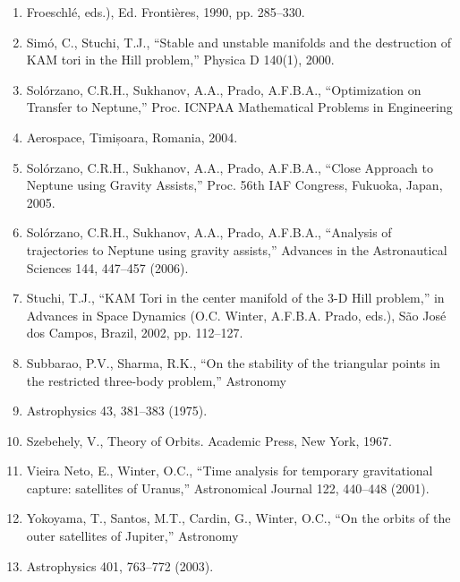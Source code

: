\documentclass[12pt]{article}
\begin{document}
\begin{enumerate}
\item Froeschlé, eds.), Ed. Frontières, 1990, pp. 285--330.
\item Simó, C., Stuchi, T.J., ``Stable and unstable manifolds and the destruction of KAM tori in the Hill problem,'' Physica D 140(1), 2000.
\item Solórzano, C.R.H., Sukhanov, A.A., Prado, A.F.B.A., ``Optimization on Transfer to Neptune,'' Proc. ICNPAA Mathematical Problems in Engineering
\item Aerospace, Timișoara, Romania, 2004.
\item Solórzano, C.R.H., Sukhanov, A.A., Prado, A.F.B.A., ``Close Approach to Neptune using Gravity Assists,'' Proc. 56th IAF Congress, Fukuoka, Japan, 2005.
\item Solórzano, C.R.H., Sukhanov, A.A., Prado, A.F.B.A., ``Analysis of trajectories to Neptune using gravity assists,'' Advances in the Astronautical Sciences 144, 447--457 (2006).
\item Stuchi, T.J., ``KAM Tori in the center manifold of the 3-D Hill problem,'' in Advances in Space Dynamics (O.C. Winter, A.F.B.A. Prado, eds.), São José dos Campos, Brazil, 2002, pp. 112--127.
\item Subbarao, P.V., Sharma, R.K., ``On the stability of the triangular points in the restricted three-body problem,'' Astronomy
\item Astrophysics 43, 381--383 (1975).
\item Szebehely, V., Theory of Orbits. Academic Press, New York, 1967.
\item Vieira Neto, E., Winter, O.C., ``Time analysis for temporary gravitational capture: satellites of Uranus,'' Astronomical Journal 122, 440--448 (2001).
\item Yokoyama, T., Santos, M.T., Cardin, G., Winter, O.C., ``On the orbits of the outer satellites of Jupiter,'' Astronomy
\item Astrophysics 401, 763--772 (2003).
\end{enumerate}
\end{document}
